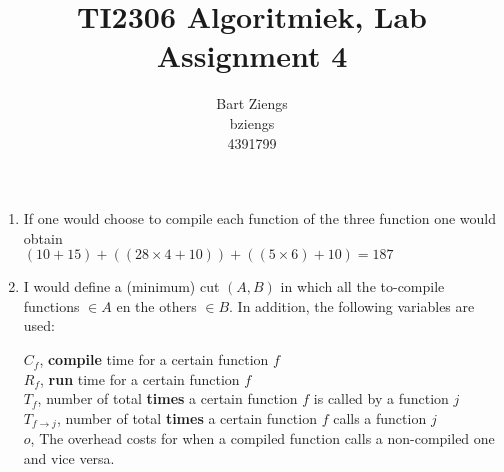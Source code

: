 \documentclass[11pt,twoside,a4paper]{article}
\title{TI2306 Algoritmiek, Lab Assignment 4} %
\author{
	Bart Ziengs \\ bziengs \\ 4391799 %
}
\begin{document}
\maketitle

\begin{enumerate}
\item If one would choose to compile each function of the three function one would obtain \\
$(10 + 15) + \left((28\times 4 + 10)\right) + \left( (5 \times 6)+10 \right) = 187 $
\item I would define a (minimum) cut $(A,B)$ in which all the to-compile functions $\in A$ en the others $\in B$. In addition, the following variables are used:

$C_f$, \textbf{compile} time for a certain function $f$ \\
$R_f$, \textbf{run} time for a certain function $f$ \\
$T_f$, number of total \textbf{times} a certain function $f$ is called by a function $j$\\
$T_{f \rightarrow j}$, number of total \textbf{times} a certain function $f$ calls a function $j$ \\
$o$, The overhead costs for when a compiled function calls a non-compiled one and vice versa. \\


\end{enumerate}
\end{document}
